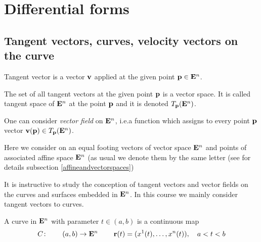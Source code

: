 \documentclass[12pt]{article}
\numberwithin{equation}{section}
\begin{document}


\section {Differential forms }




\subsection {Tangent vectors, curves, velocity vectors on the curve}



Tangent vector is a vector ${\bf v}$ applied at the given point ${\bf p}\in {\bf E}^n$.

 The set of all tangent vectors at the given point ${\bf p}$ is a vector space.
 It is called tangent space of ${\bf E}^n$ at the point ${\bf p}$ and it is denoted
 $T_{\bf p}({\bf E}^n)$.

  One can consider {\it vector field} on ${\bf E}^n$, i.e.a function which assigns
  to every point ${\bf p}$ vector ${\bf v}({\bf p})\in T_{\bf p}({\bf E}^n)$.

{\footnotesize
Here we consider on an equal footing vectors of vector space ${\bf E}^n$
and points of associated affine space ${\bf E}^n$
(as usual we denote them by the same letter
(see for details subsection \ref{affineandvectorspaces})

}

It is instructive to study the conception of tangent vectors and vector fields
on the curves and surfaces embedded in ${\bf E}^n$. In this course
we mainly consider tangent vectors to  curves.



  A curve in ${\bf E}^n$ with parameter $t\in (a,b)$ is a continuous map
\begin{equation}\label{defofcurve}
  C\colon\qquad (a,b)\rightarrow {\bf E}^n\:\qquad {\bf r}(t)=(x^1(t),\dots,x^n(t)),\quad
    a<t<b
\end{equation}
\end{document}
